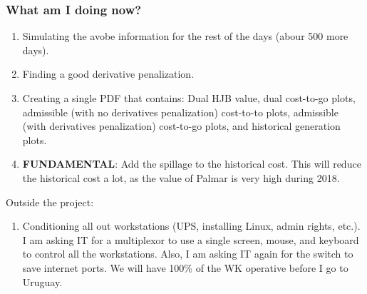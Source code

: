 \documentclass[aspectratio=169]{beamer}\usepackage[utf8]{inputenc}
\begin{document}
\begin{frame}
\frametitle{What am I doing now?}

\begin{enumerate}

\item Simulating the avobe information for the rest of the days (abour 500 more days).

\item Finding a good derivative penalization.

\item Creating a single PDF that contains: Dual HJB value, dual cost-to-go plots, admissible (with no derivatives penalization) cost-to-to plots, admissible (with derivatives penalization) cost-to-go plots, and historical generation plots.

\item \textbf{FUNDAMENTAL}: Add the spillage to the historical cost. This will reduce the historical cost a lot, as the value of Palmar is very high during 2018.

\end{enumerate}

Outside the project:

\begin{enumerate}

\item Conditioning all out workstations (UPS, installing Linux, admin rights, etc.). I am asking IT for a multiplexor to use a single screen, mouse, and keyboard to control all the workstations. Also, I am asking IT again for the switch to save internet ports. We will have 100\% of the WK operative before I go to Uruguay.

\end{enumerate}

\end{frame}
\end{document}
